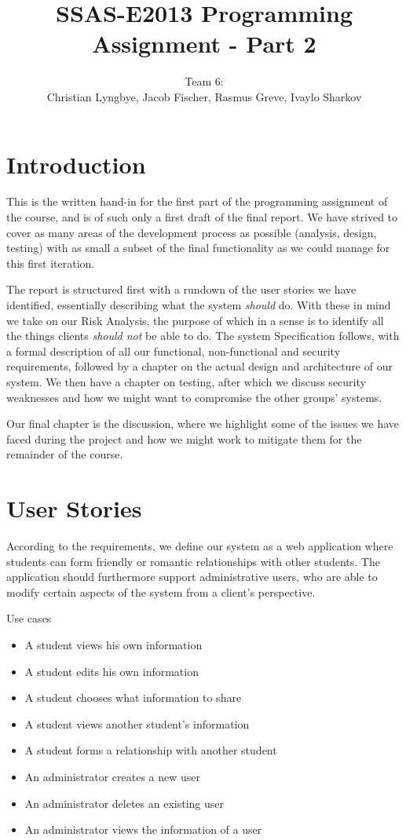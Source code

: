 \documentclass[a4paper]{article}
\title{SSAS-E2013 Programming Assignment - Part 2}
\author{Team 6:\\Christian Lyngbye, Jacob Fischer, Rasmus Greve, Ivaylo Sharkov}
\begin{document}
\maketitle

\section{Introduction}
This is the written hand-in for the first part of the programming assignment of the course, and is of such only a first draft of the final report. We have strived to cover as many areas of the development process as possible (analysis, design, testing) with as small a subset of the final functionality as we could manage for this first iteration.

The report is structured first with a rundown of the user stories we have identified, essentially describing what the system \emph{should} do. With these in mind we take on our Risk Analysis, the purpose of which in a sense is to identify all the things clients \emph{should not} be able to do. The system Specification follows, with a formal description of all our functional, non-functional and security requirements, followed by a chapter on the actual design and architecture of our system. We then have a chapter on testing, after which we discuss security weaknesses and how we might want to compromise the other groups' systems.

Our final chapter is the discussion, where we highlight some of the issues we have faced during the project and how we might work to mitigate them for the remainder of the course.

\section{User Stories}
According to the requirements, we define our system as a web application where students can form friendly or romantic relationships with other students. The application should furthermore support administrative users, who are able to modify certain aspects of the system from a client's perspective.

Use cases
\begin{itemize}
\item A student views his own information
\item A student edits his own information
\item A student chooses what information to share
\item A student views another student’s information
\item A student forms a relationship with another student
\item An administrator creates a new user
\item An administrator deletes an existing user
\item An administrator views the information of a user
\end{itemize}
\end{document}
